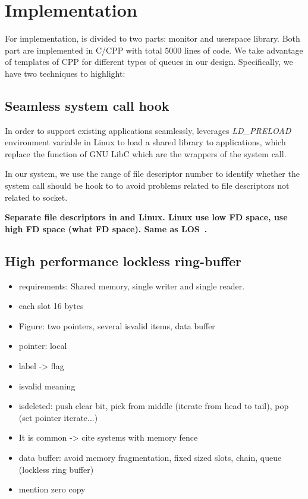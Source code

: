 \section{Implementation}
\label{sec:implementation}

For implementation, \libipc is divided to two parts: monitor and userspace library. Both part are implemented in C/CPP with total 5000 lines of code. We take advantage of templates of CPP for different types of queues in our design. Specifically, we have two techniques to highlight:
\subsection{Seamless system call hook}
\label{subsec:syscall-hook}
In order to support existing applications seamlessly, \libipc leverages \textit{LD\_PRELOAD} environment variable in Linux to load a shared library to applications, which replace the function of GNU LibC which are the wrappers of the system call. 

In our system, we use the range of file descriptor number to identify whether the system call should be hook to \libipc to avoid problems related to file descriptors not related to socket.


\textbf{
Separate file descriptors in \sys and Linux. Linux use low FD space, \sys use high FD space (what FD space). Same as LOS~\cite{huang2017high}.
}



\subsection{High performance lockless ring-buffer}
\label{subsec:lockless-queue}



\begin{itemize}
	\item requirements: Shared memory, single writer and single reader.
	\item each slot 16 bytes
	\item Figure: two pointers, several isvalid items, data buffer
	\item pointer: local
	\item label -> flag
	\item isvalid meaning
	\item isdeleted: push clear bit, pick from middle (iterate from head to tail), pop (set pointer iterate...)
	\item It is common -> cite systems with memory fence
	\item data buffer: avoid memory fragmentation, fixed sized slots, chain, queue (lockless ring buffer)
	\item mention zero copy
\end{itemize}

